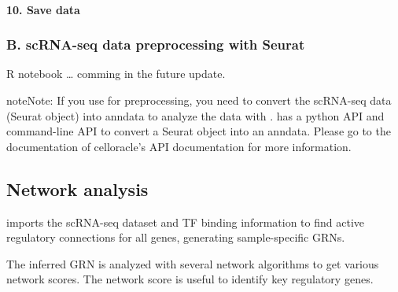 \documentclass[letterpaper,10pt,english]{sphinxmanual}
\begin{document}
\paragraph{10. Save data}
\label{\detokenize{notebooks/03_scRNA-seq_data_preprocessing/scanpy_preprocessing_with_Paul_etal_2015_data:10.-Save-data}}
{
\begin{sphinxVerbatim}[commandchars=\\\{\}]
\llap{\color{nbsphinxin}[32]:\,\hspace{\fboxrule}\hspace{\fboxsep}}
\end{sphinxVerbatim}
}


\subsubsection{B. scRNA-seq data preprocessing with Seurat}
\label{\detokenize{tutorials/scrnaprocess:b-scrna-seq-data-preprocessing-with-seurat}}
R notebook … comming in the future update.

\begin{sphinxadmonition}{note}{Note:}
If you use  for preprocessing, you need to convert the scRNA-seq data (Seurat object) into anndata to analyze the data with .
 has a python API and command-line API to convert a Seurat object into an anndata.
Please go to the documentation of celloracle’s API documentation for more information.
\end{sphinxadmonition}


\subsection{Network analysis}
\label{\detokenize{tutorials/networkanalysis:network-analysis}}\label{\detokenize{tutorials/networkanalysis:networkanalysis}}\label{\detokenize{tutorials/networkanalysis::doc}}
 imports the scRNA-seq dataset and TF binding information to find active regulatory connections for all genes, generating sample-specific GRNs.

The inferred GRN is analyzed with several network algorithms to get various network scores. The network score is useful to identify key regulatory genes.
\end{document}
